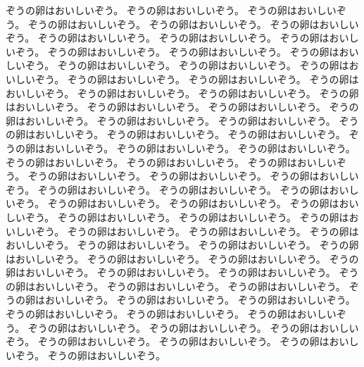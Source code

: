 ぞうの卵はおいしいぞう。
ぞうの卵はおいしいぞう。
ぞうの卵はおいしいぞう。
ぞうの卵はおいしいぞう。
ぞうの卵はおいしいぞう。
ぞうの卵はおいしいぞう。
ぞうの卵はおいしいぞう。
ぞうの卵はおいしいぞう。
ぞうの卵はおいしいぞう。
ぞうの卵はおいしいぞう。
ぞうの卵はおいしいぞう。
ぞうの卵はおいしいぞう。
ぞうの卵はおいしいぞう。
ぞうの卵はおいしいぞう。
ぞうの卵はおいしいぞう。
ぞうの卵はおいしいぞう。
ぞうの卵はおいしいぞう。
ぞうの卵はおいしいぞう。
ぞうの卵はおいしいぞう。
ぞうの卵はおいしいぞう。
ぞうの卵はおいしいぞう。
ぞうの卵はおいしいぞう。
ぞうの卵はおいしいぞう。
ぞうの卵はおいしいぞう。
ぞうの卵はおいしいぞう。
ぞうの卵はおいしいぞう。
ぞうの卵はおいしいぞう。
ぞうの卵はおいしいぞう。
ぞうの卵はおいしいぞう。
ぞうの卵はおいしいぞう。
ぞうの卵はおいしいぞう。
ぞうの卵はおいしいぞう。
ぞうの卵はおいしいぞう。
ぞうの卵はおいしいぞう。
ぞうの卵はおいしいぞう。
ぞうの卵はおいしいぞう。
ぞうの卵はおいしいぞう。
ぞうの卵はおいしいぞう。
ぞうの卵はおいしいぞう。
ぞうの卵はおいしいぞう。
ぞうの卵はおいしいぞう。
ぞうの卵はおいしいぞう。
ぞうの卵はおいしいぞう。
ぞうの卵はおいしいぞう。
ぞうの卵はおいしいぞう。
ぞうの卵はおいしいぞう。
ぞうの卵はおいしいぞう。
ぞうの卵はおいしいぞう。
ぞうの卵はおいしいぞう。
ぞうの卵はおいしいぞう。
ぞうの卵はおいしいぞう。
ぞうの卵はおいしいぞう。
ぞうの卵はおいしいぞう。
ぞうの卵はおいしいぞう。
ぞうの卵はおいしいぞう。
ぞうの卵はおいしいぞう。
ぞうの卵はおいしいぞう。
ぞうの卵はおいしいぞう。
ぞうの卵はおいしいぞう。
ぞうの卵はおいしいぞう。
ぞうの卵はおいしいぞう。
ぞうの卵はおいしいぞう。
ぞうの卵はおいしいぞう。
ぞうの卵はおいしいぞう。
ぞうの卵はおいしいぞう。
ぞうの卵はおいしいぞう。
ぞうの卵はおいしいぞう。
ぞうの卵はおいしいぞう。
ぞうの卵はおいしいぞう。
ぞうの卵はおいしいぞう。
ぞうの卵はおいしいぞう。
ぞうの卵はおいしいぞう。
ぞうの卵はおいしいぞう。
ぞうの卵はおいしいぞう。
